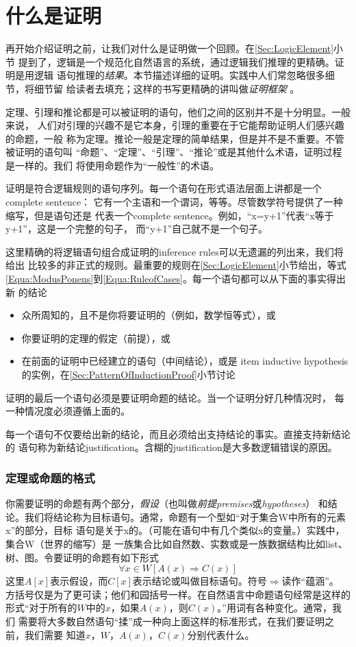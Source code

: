 \section{什么是证明}\label{Sec:WhatIsTheProof}
再开始介绍证明之前，让我们对什么是证明做一个回顾。在\ref{Sec:LogicElement}小节
提到了，逻辑是一个规范化自然语言的系统，通过逻辑我们推理的更精确。证明是用逻辑
语句推理的\emph{结果}。本节描述详细的证明。实践中人们常忽略很多细节，将细节留
给读者去填充；这样的书写更精确的讲叫做\emph{证明框架}   。

定理、引理和推论都是可以被证明的语句，他们之间的区别并不是十分明显。一般来说，
人们对引理的兴趣不是它本身，引理的重要在于它能帮助证明人们感兴趣的命题，一般
称为定理。推论一般是定理的简单结果，但是并不是不重要。不管被证明的语句叫
“命题”、“定理”、“引理”、“推论”或是其他什么术语，证明过程是一样的。我们
将使用命题作为“一般性”的术语。

证明是符合逻辑规则的语句序列。每一个语句在形式语法层面上讲都是一个complete sentence：
它有一个主语和一个谓词，等等。尽管数学符号提供了一种缩写，但是语句还是
代表一个complete sentence。例如，“x=y+1”代表“x等于y+1”，这是一个完整的句子，
而“y+1”自己就不是一个句子。

这里精确的将逻辑语句组合成证明的inference rules可以无遗漏的列出来，我们将给出
比较多的非正式的规则。最重要的规则在\ref{Sec:LogicElement}小节给出，等式
\ref{Equa:ModusPonens}到\ref{Equa:RuleofCases}。每一个语句都可以从下面的事实得出新
的结论
\begin{itemize}
\item 众所周知的，且不是你将要证明的（例如，数学恒等式），或
\item 你要证明的定理的假定（前提），或
\item 在前面的证明中已经建立的语句（中间结论），或是
        item inductive hypothesis的实例，在\ref{Sec:PatternOfInductionProof}小节讨论
\end{itemize}
\noindent 证明的最后一个语句必须是要证明命题的结论。当一个证明分好几种情况时，
每一种情况度必须遵循上面的。

每一个语句不仅要给出新的结论，而且必须给出支持结论的事实。直接支持新结论的
语句称为新结论justification。含糊的justification是大多数逻辑错误的原因。

\subsubsection{定理或命题的格式}
你需要证明的命题有两个部分，\emph{假设}（也叫做\emph{前提premises}或\emph{hypotheses}）
和结论。我们将结论称为目标语句。通常，命题有一个型如“对于集合W中所有的元素x”的部分，目标
语句是关于x的。（可能在语句中有几个类似x的变量。）实践中，集合W（世界的缩写）是
一族集合比如自然数、实数或是一族数据结构比如list、树、图。令要证明的命题有如下形式
\begin{equation}\label{Equ:3_1}
\forall x \in W[A(x)\Rightarrow C(x)]
\end{equation}
这里$A[x]$表示假设，而$C[x]$表示结论或叫做目标语句。符号$\Rightarrow$读作“蕴涵”。
方括号仅是为了更可读；他们和园括号一样。在自然语言中命题语句经常是这样的
形式“对于所有的$W$中的$x$，如果$A(x)$，则$C(x)$。”用词有各种变化。通常，我们
需要将大多数自然语句“揉”成一种向上面这样的标准形式，在我们要证明之前，我们需要
知道$x$，$W$，$A(x)$，$C(x)$分别代表什么。

